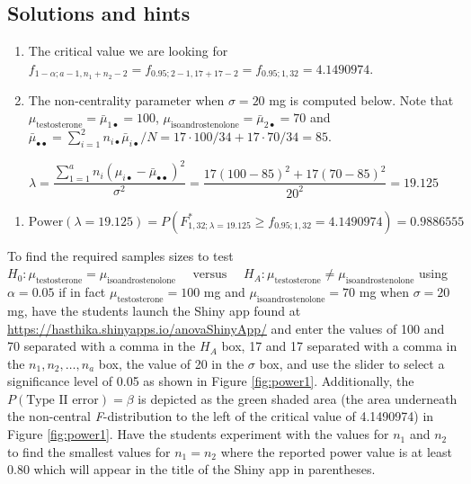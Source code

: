 \documentclass[
]{article}
\providecommand{\tightlist}{%
  \setlength{\itemsep}{0pt}\setlength{\parskip}{0pt}}
\begin{document}
\subsection*{Solutions and hints}\label{solutions-and-hints}

\begin{enumerate}
\def\labelenumi{\alph{enumi})}
\item
  The critical value we are looking for \(f_{1 - \alpha; a - 1, n_1 + n_2 -2} = f_{0.95; 2 - 1, 17 + 17 -2} = f_{0.95; 1, 32} = 4.1490974\).
\item
  The non-centrality parameter when \(\sigma = 20\) mg is computed below. Note that \(\mu_{\text{testosterone}} = \bar{\mu}_{1\bullet} = 100\), \(\mu_{\text{isoandrostenolone}} = \bar{\mu}_{2\bullet} = 70\) and \(\bar{\mu}_{\bullet\bullet}=\sum_{i=1}^{2}n_{i\bullet}\bar{\mu}_{i\bullet}/N= 17\cdot 100/34 + 17\cdot 70/34 = 85.\)
\end{enumerate}

\begin{equation*}
\lambda = \frac{\sum_{1 = 1}^an_i(\mu_{i\bullet} - \bar{\mu}_{\bullet\bullet})^2}{\sigma^2} = \frac{17(100 - 85)^2 + 17(70 - 85)^2}{20^2} = 19.125
\end{equation*}

\begin{enumerate}
\def\labelenumi{\alph{enumi})}
\setcounter{enumi}{2}
\tightlist
\item
  \(\text{Power}(\lambda = 19.125) = P(F^*_{1, 32; \lambda = 19.125} \geq f_{0.95; 1, 32} = 4.1490974) = 0.9886555\)
\end{enumerate}

To find the required samples sizes to test \(H_0: \mu_\text{testosterone} = \mu_\text{isoandrostenolone}\quad\text{ versus }\quad H_A: \mu_\text{testosterone} \neq \mu_\text{isoandrostenolone}\) using \(\alpha = 0.05\) if in fact \(\mu_\text{testosterone} = 100\) mg and \(\mu_\text{isoandrostenolone} = 70\) mg when \(\sigma = 20\) mg, have the students launch the Shiny app found at \url{https://hasthika.shinyapps.io/anovaShinyApp/} and enter the values of 100 and 70 separated with a comma in the \(H_A\) box, 17 and 17 separated with a comma in the \(n_1, n_2,\ldots, n_a\) box, the value of 20 in the \(\sigma\) box, and use the slider to select a significance level of 0.05 as shown in Figure \ref{fig:power1}. Additionally, the \(P(\text{Type II error}) = \beta\) is depicted as the green shaded area (the area underneath the non-central \emph{F}-distribution to the left of the critical value of 4.1490974) in Figure \ref{fig:power1}. Have the students experiment with the values for \(n_1\) and \(n_2\) to find the smallest values for \(n_1 = n_2\) where the reported power value is at least 0.80 which will appear in the title of the Shiny app in parentheses.
\end{document}
